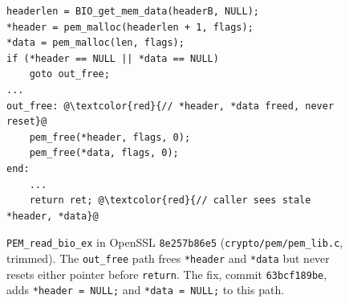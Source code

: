 \begin{figure}[t]
\begin{lstlisting}[numbers=none,escapechar=@]
headerlen = BIO_get_mem_data(headerB, NULL);
*header = pem_malloc(headerlen + 1, flags);
*data = pem_malloc(len, flags);
if (*header == NULL || *data == NULL)
    goto out_free;
...
out_free: @\textcolor{red}{// *header, *data freed, never reset}@
    pem_free(*header, flags, 0);
    pem_free(*data, flags, 0);
end:
    ...
    return ret; @\textcolor{red}{// caller sees stale *header, *data}@
\end{lstlisting}
\caption{\texttt{PEM\_read\_bio\_ex} in OpenSSL \texttt{8e257b86e5}
  (\texttt{crypto/pem/pem\_lib.c}, trimmed). The \texttt{out\_free} path
  frees \texttt{*header} and \texttt{*data} but never resets either
  pointer before \texttt{return}. The fix, commit \texttt{63bcf189be},
  adds \texttt{*header = NULL;} and \texttt{*data = NULL;} to this path.}
\label{fig:motivating}
\end{figure}
